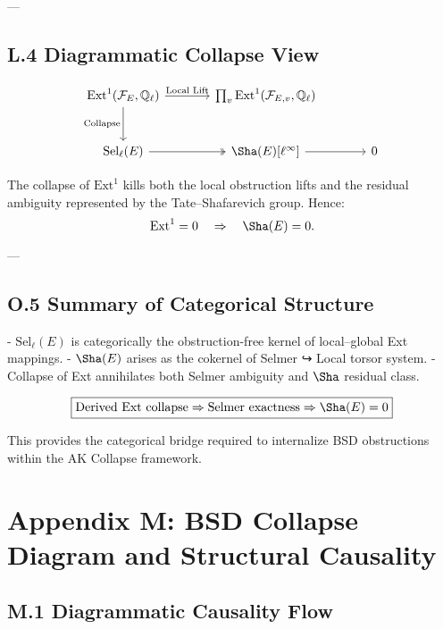 ---

\subsection*{L.4 Diagrammatic Collapse View}

\[
\begin{tikzcd}[row sep=large, column sep=large]
\mathrm{Ext}^1(\mathcal{F}_E, \mathbb{Q}_\ell) \arrow[r, "\text{Local Lift}"] \arrow[d, swap, "\text{Collapse}"] &
\prod_v \mathrm{Ext}^1(\mathcal{F}_{E,v}, \mathbb{Q}_\ell) \\
\mathrm{Sel}_\ell(E) \arrow[r, two heads] & \Sha(E)[\ell^\infty] \arrow[r] & 0
\end{tikzcd}
\]

The collapse of \( \mathrm{Ext}^1 \) kills both the local obstruction lifts and the residual ambiguity  
represented by the Tate–Shafarevich group.  
Hence:
\[
\mathrm{Ext}^1 = 0 \quad \Rightarrow \quad \Sha(E) = 0.
\]

---

\subsection*{O.5 Summary of Categorical Structure}

- \( \mathrm{Sel}_\ell(E) \) is categorically the obstruction-free kernel of local–global Ext mappings.
- \( \Sha(E) \) arises as the cokernel of Selmer ↪ Local torsor system.
- Collapse of Ext annihilates both Selmer ambiguity and \( \Sha \) residual class.

\[
\boxed{
\text{Derived Ext collapse} \Rightarrow \text{Selmer exactness} \Rightarrow \Sha(E) = 0
}
\]

This provides the categorical bridge required to internalize BSD obstructions  
within the AK Collapse framework.



\section*{Appendix M: BSD Collapse Diagram and Structural Causality}

\subsection*{M.1 Diagrammatic Causality Flow}

